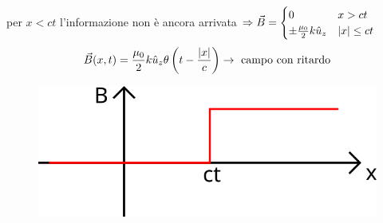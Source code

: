 \documentclass[a4paper,11pt]{report}
\newcommand{\B}{\vec{B}}
\DeclarePairedDelimiter{\abs}{\lvert}{\rvert}
\begin{document}
per $x<ct$ l'informazione non è ancora arrivata $\Rightarrow \B = \begin{cases}
	0 & x>ct \\
	\pm \frac{\mu_0}{2} k \hat{u}_z & \abs{x}\leq ct 
\end{cases}$
\[\B(x,t) = \frac{\mu_0}{2} k\hat{u}_z \theta\left(t-\frac{\abs{x}}{c}\right) \rightarrow \text{ campo con ritardo}\]
\begin{figure}[H]
	\centering
	\includegraphics[width=0.4\linewidth,keepaspectratio]{immagini/2}
	\label{fig:2}
\end{figure}
\end{document}
